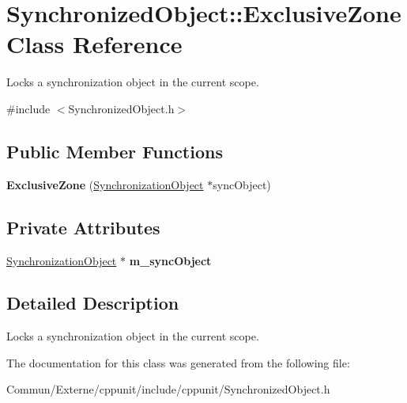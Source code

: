 \hypertarget{class_synchronized_object_1_1_exclusive_zone}{}\section{Synchronized\+Object\+:\+:Exclusive\+Zone Class Reference}
\label{class_synchronized_object_1_1_exclusive_zone}


Locks a synchronization object in the current scope.  




{\ttfamily \#include $<$Synchronized\+Object.\+h$>$}

\subsection*{Public Member Functions}
\begin{DoxyCompactItemize}
\item 
{\bfseries Exclusive\+Zone} (\hyperlink{class_synchronized_object_1_1_synchronization_object}{Synchronization\+Object} $\ast$sync\+Object)\hypertarget{class_synchronized_object_1_1_exclusive_zone_ae4393b508828328c2f4816ff9b7b090c}{}\label{class_synchronized_object_1_1_exclusive_zone_ae4393b508828328c2f4816ff9b7b090c}

\end{DoxyCompactItemize}
\subsection*{Private Attributes}
\begin{DoxyCompactItemize}
\item 
\hyperlink{class_synchronized_object_1_1_synchronization_object}{Synchronization\+Object} $\ast$ {\bfseries m\+\_\+sync\+Object}\hypertarget{class_synchronized_object_1_1_exclusive_zone_a50c450a141c25753ca1b8e46aa3850c5}{}\label{class_synchronized_object_1_1_exclusive_zone_a50c450a141c25753ca1b8e46aa3850c5}

\end{DoxyCompactItemize}


\subsection{Detailed Description}
Locks a synchronization object in the current scope. 

The documentation for this class was generated from the following file\+:\begin{DoxyCompactItemize}
\item 
Commun/\+Externe/cppunit/include/cppunit/Synchronized\+Object.\+h\end{DoxyCompactItemize}
